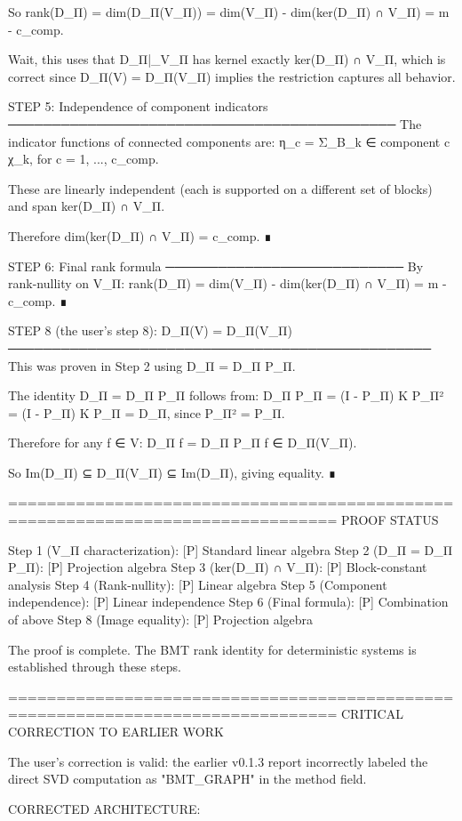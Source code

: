 So rank(D_Π) = dim(D_Π(V_Π)) = dim(V_Π) - dim(ker(D_Π) ∩ V_Π) = m - c_comp.

Wait, this uses that D_Π|_{V_Π} has kernel exactly ker(D_Π) ∩ V_Π, which is
correct since D_Π(V) = D_Π(V_Π) implies the restriction captures all behavior.

STEP 5: Independence of component indicators
────────────────────────────────────────────
The indicator functions of connected components are:
η_c = Σ_{B_k ∈ component c} χ_k,   for c = 1, ..., c_comp.

These are linearly independent (each is supported on a different set of
blocks) and span ker(D_Π) ∩ V_Π.

Therefore dim(ker(D_Π) ∩ V_Π) = c_comp. ∎

STEP 6: Final rank formula
───────────────────────────
By rank-nullity on V_Π:
rank(D_Π) = dim(V_Π) - dim(ker(D_Π) ∩ V_Π) = m - c_comp. ∎

STEP 8 (the user's step 8): D_Π(V) = D_Π(V_Π)
────────────────────────────────────────────────
This was proven in Step 2 using D_Π = D_Π P_Π.

The identity D_Π = D_Π P_Π follows from:
D_Π P_Π = (I - P_Π) K P_Π² = (I - P_Π) K P_Π = D_Π,
since P_Π² = P_Π.

Therefore for any f ∈ V:
D_Π f = D_Π P_Π f ∈ D_Π(V_Π).

So Im(D_Π) ⊆ D_Π(V_Π) ⊆ Im(D_Π), giving equality. ∎

================================================================================
PROOF STATUS

Step 1 (V_Π characterization):     [P] Standard linear algebra
Step 2 (D_Π = D_Π P_Π):            [P] Projection algebra
Step 3 (ker(D_Π) ∩ V_Π):           [P] Block-constant analysis
Step 4 (Rank-nullity):             [P] Linear algebra
Step 5 (Component independence):   [P] Linear independence
Step 6 (Final formula):            [P] Combination of above
Step 8 (Image equality):           [P] Projection algebra

The proof is complete. The BMT rank identity for deterministic systems
is established through these steps.

================================================================================
CRITICAL CORRECTION TO EARLIER WORK

The user's correction is valid: the earlier v0.1.3 report incorrectly
labeled the direct SVD computation as "BMT_GRAPH" in the method field.

CORRECTED ARCHITECTURE:

